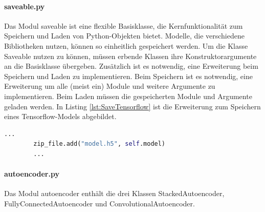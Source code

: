 	 \paragraph{saveable.py} Das Modul saveable ist eine flexible Basisklasse, die Kernfunktionalität zum Speichern und Laden von Python-Objekten bietet. Modelle, die verschiedene Bibliotheken nutzen, können so einheitlich gespeichert werden. Um die Klasse Saveable nutzen zu können, müssen erbende Klassen ihre Konstruktorargumente an die Basisklasse übergeben. Zusätzlich ist es notwendig, eine Erweiterung beim Speichern und Laden zu implementieren. Beim Speichern ist es notwendig, eine Erweiterung um alle (meist ein) Module und weitere Argumente zu implementieren. Beim Laden müssen die gespeicherten Module und Argumente geladen werden. In Listing \ref{lst:SaveTensorflow} ist die Erweiterung zum Speichern eines Tensorflow-Models abgebildet. 
	\begin{lstlisting}[language=python,caption=Erweiterung zum Speichern eines Tensorflow Models, label=lst:SaveTensorflow]
		...
		zip_file.add("model.h5", self.model)
		...
	\end{lstlisting}

	\paragraph{autoencoder.py} Das Modul autoencoder enthält die drei Klassen StackedAutoencoder, FullyConnectedAutoencoder und ConvolutionalAutoencoder. 
	
